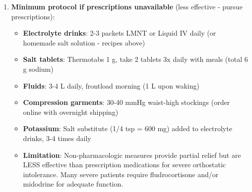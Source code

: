 \begin{enumerate}
\begin{itemize}
        \item \textbf{OPTIMAL COMBINATION for severe cases} (pursue this):
        \begin{itemize}
            \item \textbf{Fludrocortisone 0.1 mg morning} (blood volume expansion - sustained effect)
            \item \textbf{Midodrine 10 mg three times daily} (7-8am, 12-1pm, 4-5pm) - acute BP support during upright activities
            \item \textbf{High-salt diet + electrolyte drinks} (6-10 g sodium daily, 3-4 L fluids)
            \item \textbf{Compression garments} (30-40 mmHg waist-high stockings, wear all day)
            \item \textbf{Potassium supplementation} (2-4 g daily to prevent hypokalemia from fludrocortisone)
            \item \textbf{Result}: Maximal orthostatic tolerance - blood volume expanded + vascular tone maintained + mechanical support
            \item \textbf{Monitoring}: BP (supine and standing) daily for 2 weeks, then weekly. Potassium levels monthly. Weight weekly (watch for >5 lb gain/week).
            \item \textbf{CRITICAL}: Both drugs retain fluid - edema and weight gain expected but monitor for excessive retention
        \end{itemize}
    \end{itemize}

    \item \textbf{Minimum protocol if prescriptions unavailable} (less effective - pursue prescriptions):
    \begin{itemize}
        \item \textbf{Electrolyte drinks}: 2-3 packets LMNT or Liquid IV daily (or homemade salt solution - recipes above)
        \item \textbf{Salt tablets}: Thermotabs 1 g, take 2 tablets 3x daily with meals (total 6 g sodium)
        \item \textbf{Fluids}: 3-4 L daily, frontload morning (1 L upon waking)
        \item \textbf{Compression garments}: 30-40 mmHg waist-high stockings (order online with overnight shipping)
        \item \textbf{Potassium}: Salt substitute (1/4 tsp = 600 mg) added to electrolyte drinks, 3-4 times daily
        \item \textbf{Limitation}: Non-pharmacologic measures provide partial relief but are LESS effective than prescription medications for severe orthostatic intolerance. Many severe patients require fludrocortisone and/or midodrine for adequate function.
    \end{itemize}
\end{enumerate}

